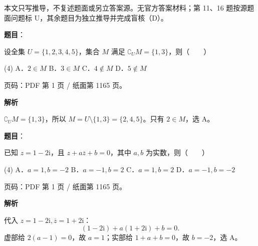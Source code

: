 

\begin{gktip}
本文只写推导，不复述题面或另立答案源。无官方答案材料；第 11、16 题按源题面问题标 U，其余题目为独立推导并完成盲核（D）。
\end{gktip}

\begin{answer}

\textbf{题目}：

设全集 $U=\{1,2,3,4,5\}$，集合 $M$ 满足 $\complement_U M=\{1,3\}$，则\mbox{（　　）}

\begin{gkopts}(4)
\task A．$2\in M$
\task B．$3\in M$
\task C．$4\notin M$
\task D．$5\notin M$
\end{gkopts}

\begin{gktip}
页码：PDF 第 1 页 / 纸面第 1165 页。
\end{gktip}

\textbf{解析}

$\complement_U M=\{1,3\}$，所以 $M=U\setminus\{1,3\}=\{2,4,5\}$。只有 $2\in M$，选 A。


\end{answer}
\begin{answer}

\textbf{题目}：

已知 $z=1-2\mathrm i$，且 $z+a\overline z+b=0$，其中 $a,b$ 为实数，则\mbox{（　　）}

\begin{gkopts}(4)
\task A．$a=1,b=-2$
\task B．$a=-1,b=2$
\task C．$a=1,b=2$
\task D．$a=-1,b=-2$
\end{gkopts}

\begin{gktip}
页码：PDF 第 1 页 / 纸面第 1165 页。
\end{gktip}

\textbf{解析}

代入 $z=1-2\mathrm i,\overline z=1+2\mathrm i$：
\nopagebreak[4]
\[
(1-2\mathrm i)+a(1+2\mathrm i)+b=0.
\]
虚部给 $2(a-1)=0$，故 $a=1$；实部给 $1+a+b=0$，故 $b=-2$，选 A。


\end{answer}
